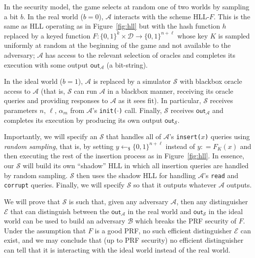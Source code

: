 \documentclass[sigconf, anonymous, dvipsnames]{acmart} %
\begin{document}
In the security model, the game selects at random one of two worlds by sampling a bit $b$. In the real world ($b=0$), ${\mathcal{A}}$ interacts with the scheme HLL-$F$. This is the same as HLL operating as in Figure~\ref{fig:hll} but with the hash function $h$ replaced by a keyed function $F: \{0,1\}^k \times {{\mathcal{D}}} \rightarrow  \{0,1\}^{n+\ell}$ whose key $K$ is sampled uniformly at random at the beginning of the game and not available to the adversary; ${\mathcal{A}}$ has access to the relevant selection of oracles and completes its execution with some output $\textsf{out}_{\mathcal{A}}$ (a bit-string).

In the ideal world ($b=1$), ${\mathcal{A}}$ is replaced by a simulator ${\mathcal{S}}$ with blackbox oracle access to ${\mathcal{A}}$ (that is, ${\mathcal{S}}$ can run ${\mathcal{A}}$ in a blackbox manner, receiving its oracle queries and providing responses to ${\mathcal{A}}$ as it sees fit). In particular, ${\mathcal{S}}$ receives parameters $n$, $\ell$, $\alpha_m$ from ${\mathcal{A}}$'s \texttt{init($\cdot$)} call. Finally, ${\mathcal{S}}$ receives $\textsf{out}_{\mathcal{A}}$ and completes its execution by producing its own output $\textsf{out}_{\mathcal{S}}$. 

Importantly, we will specify an ${\mathcal{S}}$ that handles all of ${\mathcal{A}}$'s \texttt{insert($x$)} queries using \emph{random sampling}, that is, by setting $y \leftarrow_{\$} \{0,1\}^{n+\ell}$ instead of $y: = F_K(x)$ and then executing the rest of the insertion process as in Figure~\ref{fig:hll}. In essence, our ${\mathcal{S}}$ will build its own ``shadow'' HLL in which all insertion queries are handled by random sampling. ${\mathcal{S}}$ then uses the shadow HLL for handling ${\mathcal{A}}$'s \texttt{read} and \texttt{corrupt} queries. Finally, we will specify ${\mathcal{S}}$ so that it outputs whatever ${\mathcal{A}}$ outputs.

We will prove that  ${\mathcal{S}}$ is such that, given any adversary ${\mathcal{A}}$, then any distinguisher $\mathcal{E}$ that can distinguish between the $\textsf{out}_{\mathcal{A}}$ in the real world and $\textsf{out}_{\mathcal{S}}$ in the ideal world can be used to build an adversary ${{\mathcal{B}}}$ which breaks the PRF security of $F$. Under the assumption that $F$ is a good PRF, no such efficient distinguisher $\mathcal{E}$ can exist, and we may conclude that (up to PRF security) no efficient distinguisher can tell that it is interacting with the ideal world instead of the real world. 
\end{document}
